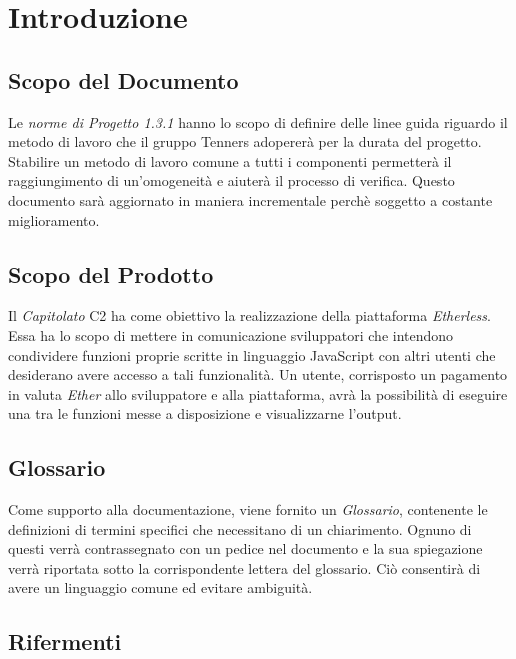 \section{Introduzione}

\subsection{Scopo del Documento}
Le \textit{norme di Progetto 1.3.1} hanno lo scopo di definire delle linee guida riguardo il metodo di lavoro che il gruppo Tenners adopererà per la durata del progetto. Stabilire un metodo di lavoro comune a tutti i componenti permetterà il raggiungimento di un'omogeneità e aiuterà il processo di verifica. Questo documento sar\`a aggiornato in maniera incrementale perchè soggetto a costante miglioramento.

\subsection{Scopo del Prodotto}
Il \textit{Capitolato\glo} C2 ha come obiettivo la realizzazione della piattaforma \textit{Etherless}. Essa ha lo scopo di mettere in comunicazione sviluppatori che intendono condividere funzioni proprie scritte in linguaggio JavaScript con altri utenti che desiderano avere accesso a tali funzionalità. Un utente, corrisposto un pagamento in valuta \textit{Ether\glos} allo sviluppatore e alla piattaforma, avrà la possibilità di eseguire una tra le funzioni messe a disposizione e visualizzarne l'output. 


\subsection{Glossario}
Come supporto alla documentazione, viene fornito un \textit{Glossario}\docs,
contenente le definizioni di termini specifici che necessitano di un chiarimento.
Ognuno di questi verr\`a contrassegnato con un pedice \glo nel documento e la sua
spiegazione verr\`a riportata sotto la corrispondente lettera del glossario. Ci\`o
consentir\`a di avere un linguaggio comune ed evitare ambiguit\`a.

\subsection{Rifermenti}
